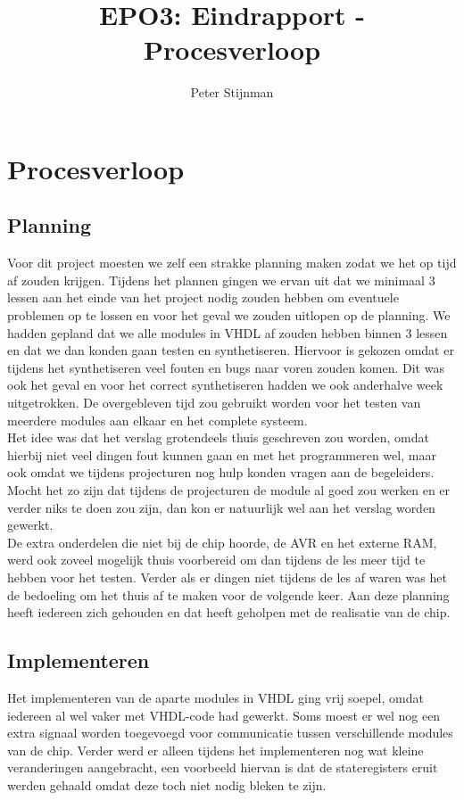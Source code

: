 \documentclass{scrartcl} %
\author{Peter Stijnman}
\title{EPO3: Eindrapport - Procesverloop}
\begin{document}
\chapter{Procesverloop}
\label{ch:procesverloop}

\section{ Planning}

Voor dit project moesten we zelf een strakke planning maken zodat we het op tijd af zouden krijgen. Tijdens het plannen gingen we ervan uit dat we minimaal 3 lessen aan het einde van het project nodig zouden hebben om eventuele problemen op te lossen
en voor het geval we zouden uitlopen op de planning. We hadden gepland dat we alle modules in VHDL af zouden hebben binnen 3 lessen en dat we dan konden gaan testen en synthetiseren. Hiervoor is gekozen omdat er tijdens het synthetiseren veel fouten en bugs naar voren zouden komen.
Dit was ook het geval en voor het correct synthetiseren hadden we ook anderhalve week uitgetrokken. De overgebleven tijd zou gebruikt worden voor het testen van meerdere modules aan elkaar en het complete systeem.\\
Het idee was dat het verslag grotendeels thuis geschreven zou worden, omdat hierbij niet veel dingen fout kunnen gaan en met het programmeren wel, maar ook omdat we tijdens projecturen nog hulp konden vragen aan de begeleiders. Mocht het zo zijn dat tijdens de projecturen de module al goed zou werken en er verder niks te doen zou zijn, dan kon er natuurlijk wel aan het verslag worden gewerkt.\\ De extra onderdelen die niet bij de chip hoorde, de AVR en het externe RAM, werd ook zoveel mogelijk thuis voorbereid om dan tijdens de les meer tijd te hebben voor het testen. Verder als er dingen niet tijdens de les af waren was het de bedoeling om het thuis af te maken voor de volgende keer. Aan deze planning heeft iedereen zich gehouden en dat heeft geholpen met de realisatie van de chip.

\section{Implementeren}

Het implementeren van de aparte modules in VHDL ging vrij soepel, omdat iedereen al wel vaker met VHDL-code had gewerkt. Soms moest er wel nog een extra signaal worden toegevoegd voor communicatie tussen verschillende modules van de chip. Verder werd er alleen tijdens het implementeren nog wat kleine veranderingen aangebracht, een voorbeeld hiervan is dat de stateregisters eruit werden gehaald omdat deze toch niet nodig bleken te zijn. 
\end{document}
